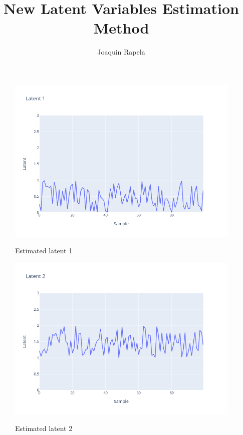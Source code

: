 \documentclass[12 pt]{article}  %
\title{New Latent Variables Estimation Method}
\author{Joaquin Rapela}
\begin{document}
\maketitle

\listoffigures

\begin{figure}
    \begin{center}
        \href{../figures/latent1.html}{\includegraphics[width=7in]{../figures/latent1.png}}
        \caption{Estimated latent 1}
        \label{fig:latent1}
    \end{center}
\end{figure}

\begin{figure}
    \begin{center}
        \href{../figures/latent2.html}{\includegraphics[width=7in]{../figures/latent2.png}}
        \caption{Estimated latent 2}
        \label{fig:latent2}
    \end{center}
\end{figure}
\end{document}
